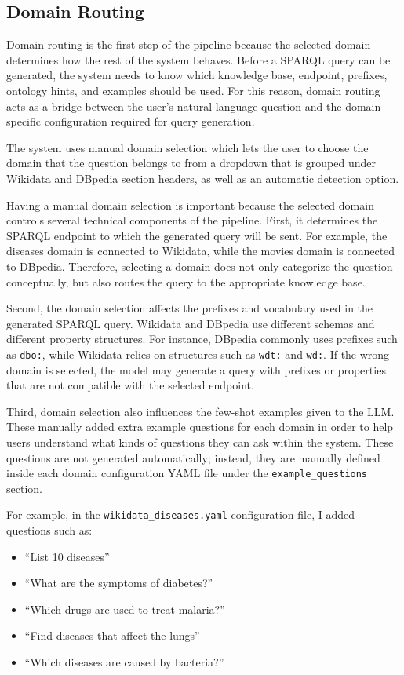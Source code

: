 \documentclass[11pt,a4paper]{article}
\begin{document}
\subsection{Domain Routing}
\label{sec:routing}

Domain routing is the first step of the pipeline because the selected domain determines how the rest of the system behaves. Before a SPARQL query can be generated, the system needs to know which knowledge base, endpoint, prefixes, ontology hints, and examples should be used. For this reason, domain routing acts as a bridge between the user's natural language question and the domain-specific configuration required for query generation.

The system uses manual domain selection which lets the user to choose the domain that the question belongs to from a dropdown that is grouped under Wikidata and DBpedia section headers, as well as an automatic detection option.

Having a manual domain selection is important because the selected domain controls several technical components of the pipeline. First, it determines the SPARQL endpoint to which the generated query will be sent. For example, the diseases domain is connected to Wikidata, while the movies domain is connected to DBpedia. Therefore, selecting a domain does not only categorize the question conceptually, but also routes the query to the appropriate knowledge base.

Second, the domain selection affects the prefixes and vocabulary used in the generated SPARQL query. Wikidata and DBpedia use different schemas and different property structures. For instance, DBpedia commonly uses prefixes such as \texttt{dbo:}, while Wikidata relies on structures such as \texttt{wdt:} and \texttt{wd:}. If the wrong domain is selected, the model may generate a query with prefixes or properties that are not compatible with the selected endpoint.

Third, domain selection also influences the few-shot examples given to the LLM. These manually added extra example questions for each domain in order to help users understand what kinds of questions they can ask within the system. These questions are not generated automatically; instead, they are manually defined inside each domain configuration YAML file under the \texttt{example\_questions} section.

For example, in the \texttt{wikidata\_diseases.yaml} configuration file, I added questions such as:

\begin{itemize}
    \item ``List 10 diseases''
    \item ``What are the symptoms of diabetes?''
    \item ``Which drugs are used to treat malaria?''
    \item ``Find diseases that affect the lungs''
    \item ``Which diseases are caused by bacteria?''
\end{itemize}
\end{document}
